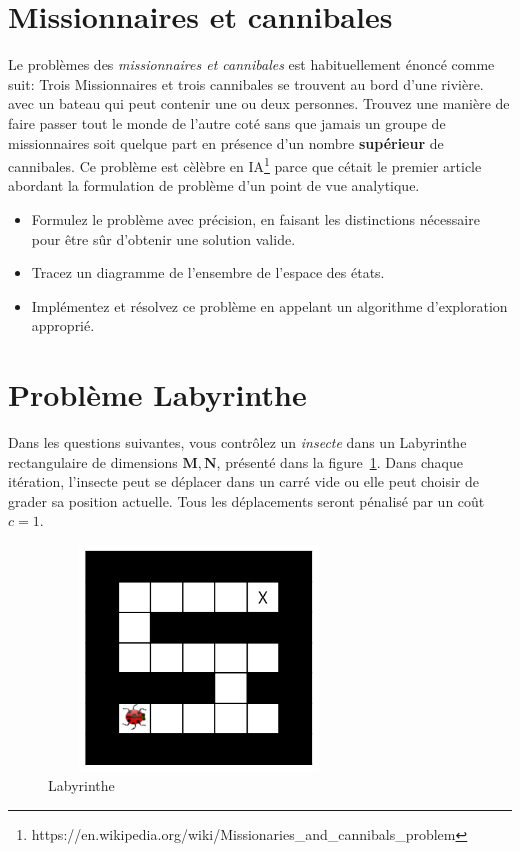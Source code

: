 \documentclass[12pt,letterpaper]{article}
\begin{document}
\section*{Missionnaires et cannibales}%
\label{sec:missionnaires_et_cannibales}
Le problèmes des \emph{missionnaires et
cannibales} est habituellement énoncé
comme suit: Trois Missionnaires et trois cannibales se trouvent au bord d'une
rivière. avec un bateau qui peut contenir une ou deux personnes. Trouvez une
manière de faire passer tout le monde de l'autre coté sans que jamais un groupe
de missionnaires soit quelque part en présence d'un nombre \textbf{supérieur} de
cannibales. Ce problème est cèlèbre en
IA\footnote{https://en.wikipedia.org/wiki/Missionaries\_and\_cannibals\_problem}
parce que cétait le premier article abordant la formulation de problème d'un
point de vue analytique.

\begin{itemize}
  \item Formulez le problème avec précision, en faisant les distinctions
    nécessaire pour être sûr d'obtenir une solution valide.

  \item Tracez un diagramme de l'ensembre de l'espace des états.
  \item Implémentez et résolvez ce problème en appelant un algorithme
    d'exploration approprié.
\end{itemize}

\section*{Problème Labyrinthe}%
\label{sec:section_name}
Dans les questions suivantes, vous contrôlez un \emph{insecte} dans un
Labyrinthe rectangulaire de dimensions $\mathbf{M,N}$, présenté dans la figure~\ref{fig:maze}. Dans chaque
itération, l'insecte peut se déplacer dans un carré vide ou elle peut choisir de
grader sa position actuelle. Tous les déplacements seront pénalisé par un coût
$c=1$.

\begin{figure}[htpb]
  \centering
  \includegraphics[width=8cm,height=6cm]{./hw1_maze1.png}
  \caption{Labyrinthe}
  \label{fig:maze}
\end{figure}
\end{document}
